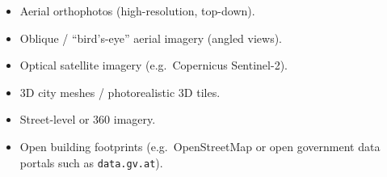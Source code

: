\documentclass[a4paper]{article}
\title{}
\date{}
\author{Mohammad Rahmani}
\begin{document}
    \maketitle
    \begin{itemize}
        \item Aerial orthophotos (high-resolution, top-down).
        \item Oblique / ``bird's-eye'' aerial imagery (angled views).
        \item Optical satellite imagery (e.g.\ Copernicus Sentinel-2).
        \item 3D city meshes / photorealistic 3D tiles.
        \item Street-level or 360\textdegree{} imagery.
        \item Open building footprints (e.g.\ OpenStreetMap or open government data portals such as \texttt{data.gv.at}).
    \end{itemize}
%    
%    
\end{document}

